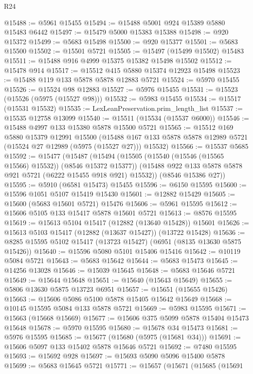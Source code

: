 \begin{lexlean}{R24}
\begin{coremodule}
@15488 := @5961 @15455
@15494 := @15488 @5001 @924 @15389 @5880 @15483 @6442
@15497 := @15479 @5000 @15383 @15388
@15498 := @920 @15372
@15499 := @5683 @15498
@15500 := @920 @15377
@15501 := @5683 @15500
@15502 := @15501 @5721
@15505 := @15497 (@15499 @15502) @15483
@15511 := @15488 @916 @4999 @15375 @15382 @15498 @15502
@15512 := @15478 @914
@15517 := @15512 @415 @5880 @15374 @12923 @15498
@15523 := @15488 @119 @133 @5878 @5878 @12883 @5721
@15524 := @5970 @15455
@15526 := @15524 @98 @12883
@15527 := @5976 @15455
@15531 := @15523 (@15526 (@5975 (@15527 @98)))
@15532 := @5983 @15455
@15534 := @15517 (@15531 @15532)
@15535 := LexLeanPreservation.prim_length_list
@15537 := @15535 @12758 @13099
@15540 := @15511 (@15534 (@15537 @6000))
@15546 := @15488 @4997 @133 @15380 @5878 @15500 @5721
@15565 := @15512
    @169
    @5880
    @15379
    @12991
    @15500
    (@15488 @167 @133 @5878 @5878 @12989 @5721 (@15524 @27 @12989 (@5975 (@15527 @27))) @15532)
@15566 := @15537 @5685
@15592 := @15477
    (@15487
      (@15494
        (@15505 (@15540 (@15546 (@15565 @15566) @15532)) (@8546 @15372 @15377))
        (@15488 @922 @133 @5878 @5878 @921 @5721 (@6222 @15455 @918 @921) @15532))
      (@8546 @15386 @27))
@15595 := @5910 (@6581 @15473) @15455
@15596 := @6150 @15595
@15600 := @15596 @1051 @5107 @15419 @15430
@15601 := @12882 @15429
@15605 := @15600 (@5683 @15601 @5721) @15476
@15606 := @5961 @15595
@15612 := @15606 @5105 @133 @15417 @5878 @15601 @5721
@15613 := @8576 @15595
@15619 := @15613 @5104 @15417 (@12882 (@13640 @15428)) @15601
@15626 := @15613 @5103 @15417 (@12882 (@13637 @15427)) (@13722 @15428)
@15636 := @8285 @15595 @5102 @15417 (@13723 @15427) (@6951 (@8135 @13630 @5875 @15426))
@15640 := @15596 @5080 @5101 @15406 @15416
@15642 := @10119 @5084 @5721
@15643 := @5683 @15642
@15644 := @5683 @15473
@15645 := @14256 @13028
@15646 := @15039 @15645
@15648 := @5683 @15646 @5721
@15649 := @15644 @15648
@15651 := @15640 (@15643 @15649)
@15655 := @5806 @13630 @5875 @13723 @6951
@15657 := @15651 (@15655 @15426)
@15663 := @15606 @5086 @5100 @5878 @15405 @15642 @15649
@15668 := @10145 @15595 @5084 @133 @5878 @5721
@15669 := @5983 @15595
@15671 := @15663 (@15668 @15669)
@15677 := @15606 @375 @5099 @5878 @15404 @15473 @15648
@15678 := @5970 @15595
@15680 := @15678 @34 @15473
@15681 := @5976 @15595
@15685 := @15677 (@15680 (@5975 (@15681 @34)))
@15691 := @15606 @5097 @133 @15402 @5878 @15646 @5721
@15692 := @7480 @15595
@15693 := @15692 @928
@15697 := @15693 @5090 @5096 @15400 @5878
@15699 := @5683 @15645 @5721
@15771 := @15657
    (@15671
      (@15685
        (@15691

\end{coremodule}
\end{lexlean}
